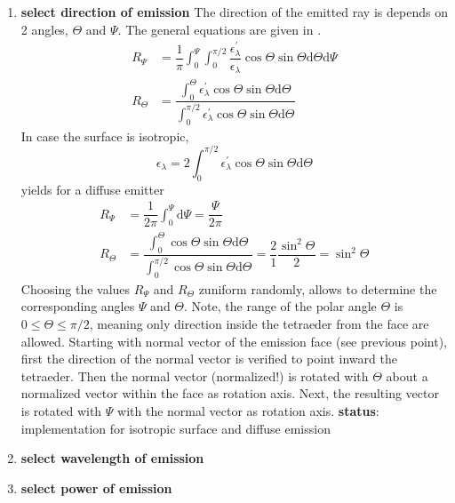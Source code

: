 \documentclass[a4paper,10pt]{scrartcl}
\begin{document}
\begin{enumerate}
 \item \textbf{select direction of emission}
       The direction of the emitted ray is depends on 2 angles, $\Theta$ and $\Psi$. The general equations are given in \cite[p.~653f.]{Mod03}. 
       \begin{align}
        R_\Psi & = \dfrac{1}{\pi} \int_0^\Psi \int_0^{\pi/2} \dfrac{\epsilon^\prime_\lambda}{\epsilon_\lambda} \cos \Theta \sin \Theta \mathrm{d} \Theta \mathrm{d} \Psi \\
        R_\Theta & = \dfrac{\int_0^\Theta \epsilon^\prime_\lambda \cos \Theta \sin \Theta \mathrm{d} \Theta}{\int_0^{\pi/2} \epsilon^\prime_\lambda \cos \Theta \sin \Theta \mathrm{d} \Theta} 
       \end{align}
       In case the surface is isotropic, 
       \begin{equation}
        \epsilon_\lambda = 2 \int_0^{\pi/2} \epsilon^\prime_\lambda \cos \Theta \sin \Theta \mathrm{d}\Theta
       \end{equation}
       yields for a diffuse emitter
       \begin{align}
        R_\Psi & = \dfrac{1}{2\pi} \int_0^\Psi \mathrm{d} \Psi = \dfrac{\Psi}{2 \pi} \\
        R_\Theta & = \dfrac{\int_0^\Theta \cos \Theta \sin \Theta \mathrm{d} \Theta}{\int_0^{\pi/2} \cos \Theta \sin \Theta \mathrm{d} \Theta} = \dfrac{2}{1} \dfrac{\sin^2 \Theta}{2} = \sin^2 \Theta
       \end{align}
       Choosing the values $R_\Psi$ and $R_\Theta$ zuniform randomly, allows to determine the corresponding angles $\Psi$ and $\Theta$. Note, the range of the polar angle $\Theta$ is $0 \le \Theta \le \pi/2$, meaning only direction inside the tetraeder from the face are allowed. Starting with normal vector of the emission face (see previous point), first the direction of the normal vector is verified to point inward the tetraeder. Then the normal vector (normalized!) is rotated with $\Theta$ about a normalized vector within the face as rotation axis. Next, the resulting vector is rotated with $\Psi$ with the normal vector as rotation axis.
       \textbf{status}: implementation for isotropic surface and diffuse emission

 \item \textbf{select wavelength of emission}
 \item \textbf{select power of emission}
\end{enumerate}



\end{document}
